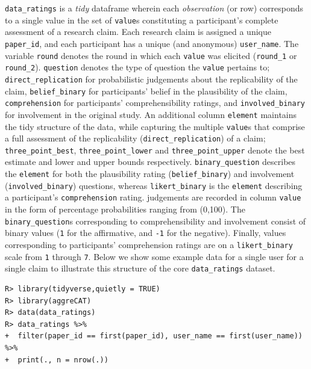 \documentclass[article]{jss}
\begin{document}
\texttt{data\_ratings} is a \emph{tidy} dataframe wherein each
\emph{observation} (or row) corresponds to a single value in the set of
\texttt{value}s constituting a participant's complete assessment of a
research claim. Each research claim is assigned a unique
\texttt{paper\_id}, and each participant has a unique (and anonymous)
\texttt{user\_name}. The variable \texttt{round} denotes the round in
which each \texttt{value} was elicited (\texttt{round\_1} or
\texttt{round\_2}). \texttt{question} denotes the type of question the
\texttt{value} pertains to; \texttt{direct\_replication} for
probabilistic judgements about the replicability of the claim,
\texttt{belief\_binary} for participants' belief in the plausibility of
the claim, \texttt{comprehension} for participants' comprehensibility
ratings, and \texttt{involved\_binary} for involvement in the original
study. An additional column \texttt{element} maintains the tidy
structure of the data, while capturing the multiple \texttt{value}s that
comprise a full assessment of the replicability
(\texttt{direct\_replication}) of a claim; \texttt{three\_point\_best},
\texttt{three\_point\_lower} and \texttt{three\_point\_upper} denote the
best estimate and lower and upper bounds respectively.
\texttt{binary\_question} describes the \texttt{element} for both the
plausibility rating (\texttt{belief\_binary}) and involvement
(\texttt{involved\_binary}) questions, whereas \texttt{likert\_binary}
is the \texttt{element} describing a participant's
\texttt{comprehension} rating. judgements are recorded in column
\texttt{value} in the form of percentage probabilities ranging from
(0,100). The \texttt{binary\_question}s corresponding to
comprehensibility and involvement consist of binary values (\texttt{1}
for the affirmative, and \texttt{-1} for the negative). Finally, values
corresponding to participants' comprehension ratings are on a
\texttt{likert\_binary} scale from \texttt{1} through \texttt{7}. Below
we show some example data for a single user for a single claim to
illustrate this structure of the core \texttt{data\_ratings} dataset.

\begin{verbatim}
R> library(tidyverse,quietly = TRUE)
R> library(aggreCAT)
R> data(data_ratings)
R> data_ratings %>% 
+  filter(paper_id == first(paper_id), user_name == first(user_name)) %>% 
+  print(., n = nrow(.))
\end{verbatim}
\end{document}
